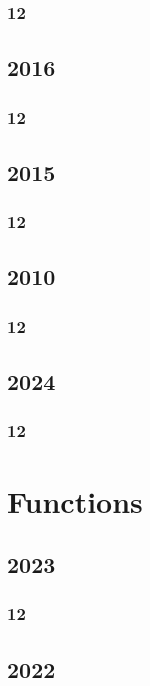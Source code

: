 \documentclass[11pt]{book}
\begin{document}
\subsection{12}


\section{2016}
\subsection{12}



\section{2015}
\subsection{12}


\section{2010}
\subsection{12}


\section{2024}
\subsection{12}


\chapter{Functions}
\section{2023}
\subsection{12}

\section{2022}
\end{document}
